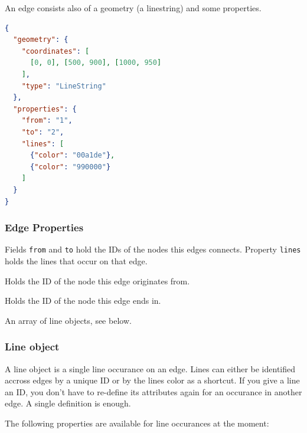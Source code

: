 \documentclass[10pt,a4paper]{article}
\begin{document}
An edge consists also of a geometry (a linestring) and some properties.

\begin{minipage}{\linewidth}
\begin{lstlisting}[language=json,firstnumber=1]
{
  "geometry": {
	"coordinates": [
	  [0, 0], [500, 900], [1000, 950]
	],
	"type": "LineString"
  },
  "properties": {
	"from": "1",
	"to": "2",
	"lines": [
	  {"color": "00a1de"},
	  {"color": "990000"}
	]
  }
}
\end{lstlisting}
\end{minipage}


\subsubsection{Edge Properties}

Fields \texttt{from} and \texttt{to} hold the IDs of the nodes this edges connects. Property \texttt{lines} holds the lines that occur on that edge.

\begin{description}[align=right]
  \item[\texttt{from}] Holds the ID of the node this edge originates from.
  \item[\texttt{to}] Holds the ID of the node this edge ends in.
  \item[\texttt{lines}] An array of line objects, see below.
\end{description}

\subsubsection{Line object}

A line object is a single line occurance on an edge. Lines can either be identified accross edges by a unique ID or by the lines color as a shortcut. If you give a line an ID, you don't have to re-define its attributes again for an occurance in another edge. A single definition is enough.

The following properties are available for line occurances at the moment:
\end{document}
